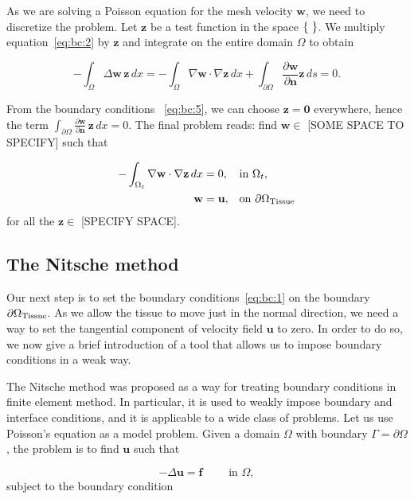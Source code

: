\documentclass[11pt,a4paper,titlepage]{report}
\begin{document}
As we are solving a Poisson equation for the mesh velocity $\mathbf{w}$, we need to discretize the problem. Let $\mathbf{z}$ be a test function in the space $\set{}$. We multiply equation~\eqref{eq:bc:2} by $\mathbf{z}$ and integrate on the entire domain $\Omega$ to obtain

\begin{equation}
\label{eq:bc:4}
- \int_{\Omega} \Delta \mathbf{w} \, \mathbf{z} \, dx
= - \int_{\Omega} \nabla \mathbf{w} \cdot \nabla \mathbf{z} \, dx
+ \int_{\partial \Omega} \frac{\partial \mathbf{w}}{\partial \mathbf{n}} \mathbf{z} \, ds = 0.
\end{equation}

From the boundary conditions ~\eqref{eq:bc:5}, we can choose $\mathbf{z = 0}$ everywhere, hence the term $\int_{\partial \Omega} \frac{\partial \mathbf{w}}{\partial \mathbf{n}} \, \mathbf{z} \, dx  = 0$. The final problem reads: find $\mathbf{w} \in$ [SOME SPACE TO SPECIFY] such that

\begin{align}
-  \int_{\Omega_t} \nabla \mathbf{w} \cdot \nabla \mathbf{z} \, dx &= 0, && \text{in } \Omega_t, \\
 \mathbf{w} &= \mathbf{u}, && \text{on } \partial \Omega_{\rm Tissue}
\end{align}
for all the $ \mathbf{z} \in $ [SPECIFY SPACE].


\subsection{The Nitsche method}
Our next step is to set the boundary conditions~\eqref{eq:bc:1} on the boundary $\partial \Omega_{\rm Tissue}$. As we allow the tissue to move just in the normal direction, we need a way to set the tangential component of velocity field $\mathbf{u}$ to zero. In order to do so, we now give a brief introduction of a tool that allows us to impose boundary conditions in a weak way.

The Nitsche method was proposed as a way for treating boundary conditions in finite element method. In particular, it is used to weakly impose boundary and interface conditions, and it is applicable to a wide class of problems. Let us use Poisson's equation as a model problem. Given a domain $\Omega$ with boundary $\Gamma = \partial \Omega$, the problem is to find $\mathbf{u}$ such that

\begin{equation}
- \Delta \mathbf{u} = \mathbf{f} \qquad \text{ in } \Omega,
\label{eq:nitsche:1}
\end{equation}
subject to the boundary condition
\end{document}
